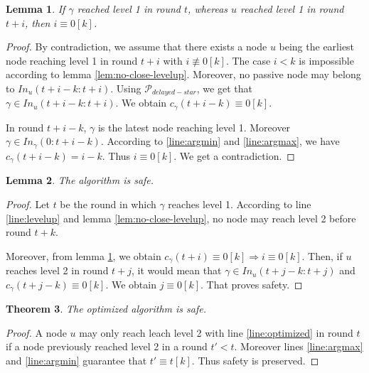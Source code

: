 \documentclass[11pt,letterpaper]{article}
\newtheorem{thm}{Theorem}
\newtheorem{lem}[thm]{Lemma}
\newcommand{\cent}{\gamma}
\begin{document}
\begin{lem} \label{lem:later-level}
	If $\cent$ reached level 1 in round $t$, whereas $u$ reached level 1 in round $t+i$, then $i \equiv 0 [k]$. 
\end{lem}
\begin{proof}
	By contradiction, we assume that there exists a node $u$ being the earliest node reaching level 1 in round $t+i$ with $i \not\equiv 0 [k]$.
	The case $i < k$ is impossible according to lemma \ref{lem:no-close-levelup}.
	Moreover, no passive node may belong to $In_u(t+i-k:t+i)$.
	Using $\mathcal{P}_{delayed-star}$, we get that $\cent \in In_u(t+i-k:t+i)$.
	We obtain $c_\cent(t+i-k) \equiv 0 [k]$.

	In round $t+i-k$, $\cent$ is the latest node reaching level 1. Moreover $\cent \in In_\cent(0:t+i-k)$.
	According to \ref{line:argmin} and \ref{line:argmax}, we have $c_\cent(t+i-k) = i-k$.
	Thus $i \equiv 0 [k]$. We get a contradiction.
\end{proof}

\begin{lem}
	The algorithm is safe.
\end{lem}
\begin{proof}
	Let $t$ be the round in which $\cent$ reaches level 1.
	According to line \ref{line:levelup} and lemma \ref{lem:no-close-levelup}, no node may reach level 2 before round $t+k$.

	Moreover, from lemma \ref{lem:later-level}, we obtain $c_\cent(t+i) \equiv 0 [k] \Rightarrow i \equiv 0 [k]$.
	Then, if $u$ reaches level 2 in round $t+j$, it would mean that $\cent \in In_u(t+j-k:t+j)$ and $c_\cent(t+j-k) \equiv 0 [k]$.
	We obtain $j \equiv 0 [k]$. That proves safety.
\end{proof}

\begin{thm}
	The optimized algorithm is safe.
\end{thm}
\begin{proof}
	A node $u$ may only reach leach level 2 with line \ref{line:optimized} in round $t$ if a node previously reached level 2 in a round $t' < t$.
	Moreover lines \ref{line:argmax} and \ref{line:argmin} guarantee that $t' \equiv t [k]$.
	Thus safety is preserved.
\end{proof}
\end{document}
